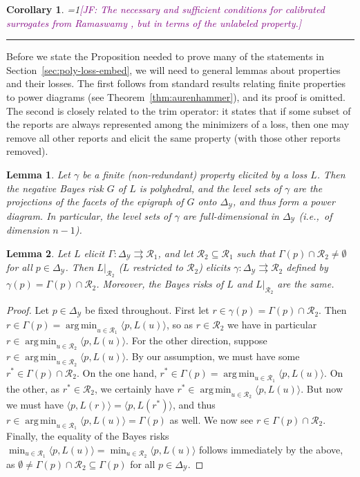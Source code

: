 \documentclass[12pt]{article}
\newcommand{\Comments}{1}
\newcommand{\mynote}[2]{\ifnum\Comments=1\textcolor{#1}{#2}\fi}
\newcommand{\jessie}[1]{\mynote{purple}{[JF: #1]}}
\newcommand{\simplex}{\Delta_\Y}
\newcommand{\R}{\mathcal{R}}
\newcommand{\Y}{\mathcal{Y}}
\newcommand{\inprod}[2]{\langle #1, #2 \rangle}%
\newcommand{\toto}{\rightrightarrows}
\DeclareMathOperator*{\argmin}{arg\,min}
\newtheorem{lemma}{Lemma}
\newtheorem{corollary}{Corollary}
\begin{document}
\begin{corollary}
	\jessie{The necessary and sufficient conditions for calibrated surrogates from Ramaswamy \cite{ramaswamy2016convex}, but in terms of the unlabeled property.}
\end{corollary}
\hrule

Before we state the Proposition needed to prove many of the statements in Section~\ref{sec:poly-loss-embed}, we will need to general lemmas about properties and their losses.
The first follows from standard results relating finite properties to power diagrams (see Theorem~\ref{thm:aurenhammer}), and its proof is omitted.
The second is closely related to the trim operator: it states that if some subset of the reports are always represented among the minimizers of a loss, then one may remove all other reports and elicit the same property (with those other reports removed).

\begin{lemma}\label{lem:finite-full-dim}
  Let $\gamma$ be a finite (non-redundant) property elicited by a loss $L$.
  Then the negative Bayes risk $G$ of $L$ is polyhedral, and the level sets of $\gamma$ are the projections of the facets of the epigraph of $G$ onto $\simplex$, and thus form a power diagram.
  In particular, the level sets of $\gamma$ are full-dimensional in $\simplex$ (i.e.,\ of dimension $n-1$).
\end{lemma}

\begin{lemma}\label{lem:loss-restrict}
  Let $L$ elicit $\Gamma:\simplex\toto\R_1$, and let $\R_2\subseteq\R_1$ such that $\Gamma(p) \cap \R_2 \neq \emptyset$ for all $p\in\simplex$.
  Then $L|_{\R_2}$ ($L$ restricted to $\R_2$) elicits $\gamma:\simplex\toto\R_2$ defined by $\gamma(p) = \Gamma(p)\cap \R_2$.
  Moreover, the Bayes risks of $L$ and $L|_{\R_2}$ are the same.
\end{lemma}
\begin{proof}
  Let $p\in\simplex$ be fixed throughout.
  First let $r \in \gamma(p) = \Gamma(p) \cap \R_2$.
  Then $r \in \Gamma(p) = \argmin_{u\in\R_1} \inprod{p}{L(u)}$, so as $r\in\R_2$ we have in particular $r \in \argmin_{u\in\R_2} \inprod{p}{L(u)}$.
  For the other direction, suppose $r \in \argmin_{u\in\R_2} \inprod{p}{L(u)}$.
  By our assumption, we must have some $r^* \in \Gamma(p) \cap \R_2$.
  On the one hand, $r^*\in\Gamma(p) = \argmin_{u\in\R_1} \inprod{p}{L(u)}$.
  On the other, as $r^* \in \R_2$, we certainly have $r^* \in \argmin_{u\in\R_2} \inprod{p}{L(u)}$.
  But now we must have $\inprod{p}{L(r)} = \inprod{p}{L(r^*)}$, and thus $r \in \argmin_{u\in\R_1} \inprod{p}{L(u)} = \Gamma(p)$ as well.
  We now see $r \in \Gamma(p) \cap \R_2$.
  Finally, the equality of the Bayes risks $\min_{u\in\R_1} \inprod{p}{L(u)} = \min_{u\in\R_2} \inprod{p}{L(u)}$ follows immediately by the above, as $\emptyset \neq \Gamma(p)\cap\R_2 \subseteq \Gamma(p)$ for all $p\in\simplex$.
\end{proof}
\end{document}
